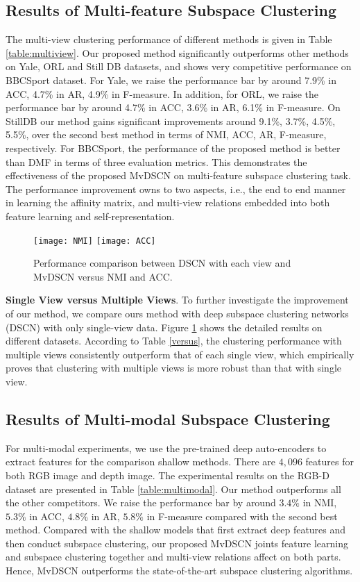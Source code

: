 \documentclass[journal]{IEEEtran}
\begin{document}
\subsection{Results of Multi-feature Subspace Clustering}
The multi-view clustering performance of different methods is given in Table \ref{table:multiview}.
Our proposed method significantly outperforms other methods on Yale, ORL and Still DB datasets, and shows very competitive performance on BBCSport dataset.
For Yale, we raise the performance bar by around 7.9\% in ACC, 4.7\% in AR, 4.9\% in F-measure.
In addition, for ORL, we raise the performance bar by around 4.7\% in ACC, 3.6\% in AR, 6.1\% in F-measure.
On StillDB our method gains significant improvements around 9.1\%, 3.7\%, 4.5\%, 5.5\%, over the second best method in terms of NMI, ACC, AR, F-measure, respectively.
For BBCSport, the performance of the proposed method is better than DMF in terms of three evaluation metrics.
This demonstrates the effectiveness of the proposed MvDSCN on multi-feature subspace clustering task.
The performance improvement owns to two aspects, i.e., the end to end manner in learning the affinity matrix, and multi-view relations embedded into both feature learning and self-representation.
\begin{figure}[!htbp]
	\centering
	\texttt{[image: NMI]}
	\texttt{[image: ACC]}
	\caption{Performance comparison between DSCN \cite{ji2017deep} with each view and MvDSCN versus NMI and ACC.}
	\label{fig:svsm}
\end{figure}

\textbf{Single View versus Multiple Views}.
To further investigate the improvement of our method, we compare ours method with deep subspace clustering networks (DSCN) \cite{ji2017deep} with only single-view data.
Figure \ref{fig:svsm} shows the detailed results on different datasets.
According to Table \ref{versus}, the clustering performance with multiple views consistently outperform that of each single view, which empirically proves that clustering with multiple views is more robust than that with single view.








\subsection{Results of Multi-modal Subspace Clustering}
For multi-modal experiments, we use the pre-trained deep auto-encoders to extract features for the comparison shallow methods.
There are $4,096$ features for both RGB image and depth image.
The experimental results on the RGB-D dataset are presented in Table \ref{table:multimodal}.
Our method outperforms all the other competitors.
We raise the performance bar by around $3.4\%$ in NMI, $5.3\%$ in ACC, $4.8\%$ in AR, $5.8\%$ in F-measure compared with the second best method.
Compared with the shallow models that first extract deep features and then conduct subspace clustering, our proposed MvDSCN joints feature learning and subspace clustering together and multi-view relations affect on both parts. Hence, MvDSCN outperforms the state-of-the-art subspace clustering algorithms.
\end{document}

